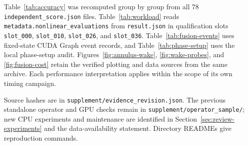 Table~\ref{tab:accuracy} was recomputed group by group from all 78
\texttt{independent\_score.json} files. Table~\ref{tab:workload} reads
\texttt{metadata.nonlinear\_evaluations} from \texttt{result.json} in
qualification slots \texttt{slot\_000}, \texttt{slot\_010},
\texttt{slot\_026}, and \texttt{slot\_036}.
Table~\ref{tab:fusion-events} uses fixed-state CUDA Graph event records,
and Table~\ref{tab:phase-setup} uses the local phase-setup audit.
Figures~\ref{fig:annulus-wake}, \ref{fig:wake-probes}, and
\ref{fig:fusion-cost} retain the verified plotting and data sources from
the same archive. Each performance interpretation applies within the
scope of its own timing campaign.

Source hashes are in \nolinkurl{supplement/evidence_revision.json}. The previous standalone operator and GPU checks remain in \nolinkurl{supplement/operator_sample/}; new CPU experiments and maintenance are identified in Section~\ref{sec:review-experiments} and the data-availability statement. Directory READMEs give reproduction commands.
\endgroup
